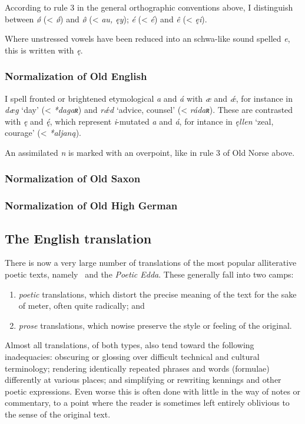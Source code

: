     According to rule 3 in the general orthographic conventions above, I distinguish between \emph{ǿ} (< \emph{ǿ}) and \emph{ø̂} (< \emph{au, ęy}); \emph{é} (< \emph{é}) and \emph{ê} (< \emph{ęi}).

    Where unstressed vowels have been reduced into an schwa-like sound spelled \emph{e}, this is written with \emph{ę}.

    \subsubsection{Normalization of Old English}
    I spell fronted or brightened etymological \emph{a} and \emph{á} with \emph{æ} and \emph{ǽ}, for instance in \emph{dæg} ‘day’ (< \emph{*dagaʀ}) and \emph{rǽd} ‘advice, counsel’ (< \emph{rádaʀ}).  These are contrasted with \emph{ę} and \emph{ę́}, which represent \emph{i}-mutated \emph{a} and \emph{á}, for intance in \emph{ęllen} ‘zeal, courage’ (< \emph{*aljaną}).

    An assimilated \emph{n} is marked with an overpoint, like in rule 3 of Old Norse above.

    \subsubsection{Normalization of Old Saxon}

    \subsubsection{Normalization of Old High German}

  \subsection{The English translation}

    There is now a very large number of translations of the most popular alliterative poetic texts, namely \Beowulf\ and the \emph{Poetic Edda}.  These generally fall into two camps:
    \begin{enumerate}
      \item \emph{poetic} translations, which distort the precise meaning of the text for the sake of meter, often quite radically; and
      \item \emph{prose} translations, which nowise preserve the style or feeling of the original.
    \end{enumerate}

    Almost all translations, of both types, also tend toward the following inadequacies: obscuring or glossing over difficult technical and cultural terminology; rendering identically repeated phrases and words (formulae) differently at various places; and simplifying or rewriting kennings and other poetic expressions.  Even worse this is often done with little in the way of notes or commentary, to a point where the reader is sometimes left entirely oblivious to the sense of the original text.

